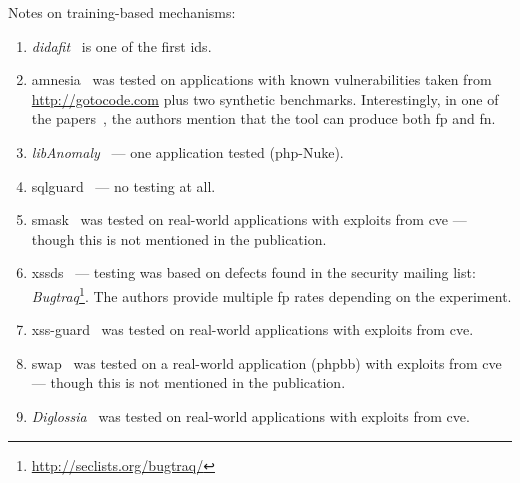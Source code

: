 \documentclass[conference]{IEEEtran}
\begin{document}
Notes on training-based mechanisms:
\begin{enumerate}
\item {\it {\sc didafit}}~\cite{LLW02} is one of
the first {\sc ids}.
\item {\sc amnesia}~\cite{HO05,HO06,HO05b} was tested
on applications with known vulnerabilities taken
from \url{http://gotocode.com} plus two synthetic benchmarks.
Interestingly, in one of the papers~\cite{HO06},
the authors mention that the tool can produce both {\sc fp} and
{\sc fn}.
\item {\it libAnomaly}~\cite{VMV05} --- one application tested ({\sc php}-Nuke).
\item {\sc sqlg}uard~\cite{BWS05} --- no testing at all.
\item {\sc sm}ask~\cite{JB07} was tested on real-world applications
with exploits from {\sc cve} --- though this is not mentioned in the publication.
\item {\sc xssds}~\cite{JEP08} --- testing was based on 
defects found in the security mailing
list: {\it Bugtraq}\footnote{\url{http://seclists.org/bugtraq/}}.
The authors provide multiple {\sc fp} rates depending on the experiment.
\item {\sc xss-guard}~\cite{BV08} was tested on real-world applications
with exploits from {\sc cve}.
\item {\sc swap}~\cite{WPLKK09} was tested on a real-world application ({\sc phpbb})
with exploits from {\sc cve} --- though this is not mentioned in the publication.
\item {\it Diglossia}~\cite{SMS13} was tested on real-world applications
with exploits from {\sc cve}.
\end{enumerate}
\end{document}
